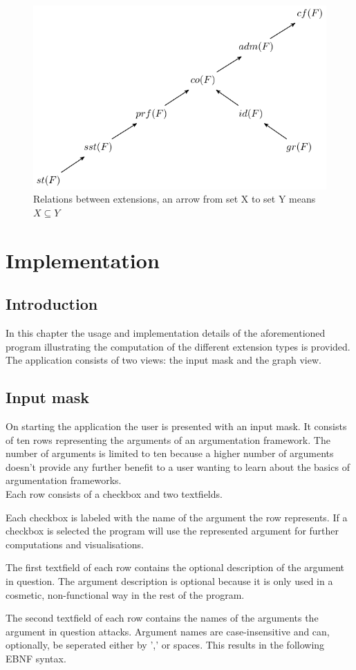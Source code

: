 \documentclass[draft,final]{vutinfth} %
\newcommand{\hl}{\par\vspace{6pt}} %
\begin{document}
\FloatBarrier %
	\begin{figure}[!h]
		\centering
		\includegraphics[scale=1]{graphs/diagram_2.pdf}
		\caption{Relations between extensions, an arrow from set X to set Y means $X\subseteq Y$}
	\end{figure}
\FloatBarrier

\chapter{Implementation}

\section{Introduction}
In this chapter the usage and implementation details of the aforementioned program illustrating the computation of the different extension types is provided. The application consists of two views: the input mask and the graph view.

\section{Input mask}
On starting the application the user is presented with an input mask. It consists of ten rows representing the arguments of an argumentation framework. The number of arguments is limited to ten because a higher number of arguments doesn't provide any further benefit to a user wanting to learn about the basics of argumentation frameworks.\\
Each row consists of a checkbox and two textfields.\hl
Each checkbox is labeled with the name of the argument the row represents. If a checkbox is selected the program will use the represented argument for further computations and visualisations.\hl
The first textfield of each row contains the optional description of the argument in question. The argument description is optional because it is only used in a cosmetic, non-functional way in the rest of the program.\hl
The second textfield of each row contains the names of the arguments the argument in question attacks. Argument names are case-insensitive and can, optionally, be seperated either by ',' or spaces. This results in the following EBNF syntax.\hl %
\end{document}

